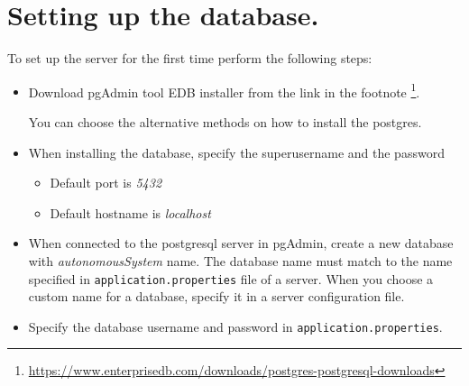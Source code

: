 \section{Setting up the database.}
\label{sec:setting-up-the-databse.}
To set up the server for the first time perform the following steps:
\begin{itemize}
    \item Download pgAdmin tool EDB installer from the link in the
    footnote \footnote{\url{https://www.enterprisedb.com/downloads/postgres-postgresql-downloads}}.

    You can choose the alternative methods on how to install the postgres.
    \item When installing the database, specify the superusername and the password
    \begin{itemize}
        \item Default port is \emph{5432}
        \item Default hostname is \emph{localhost}
    \end{itemize}
    \item When connected to the postgresql server in pgAdmin, create a new database with \emph{autonomousSystem} name.
    The database name must match to the name specified in \texttt{application.properties} file of a server.
    When you choose a custom name for a database, specify it in a server configuration file.
    \item Specify the database username and password in \texttt{application.properties}.
\end{itemize}
